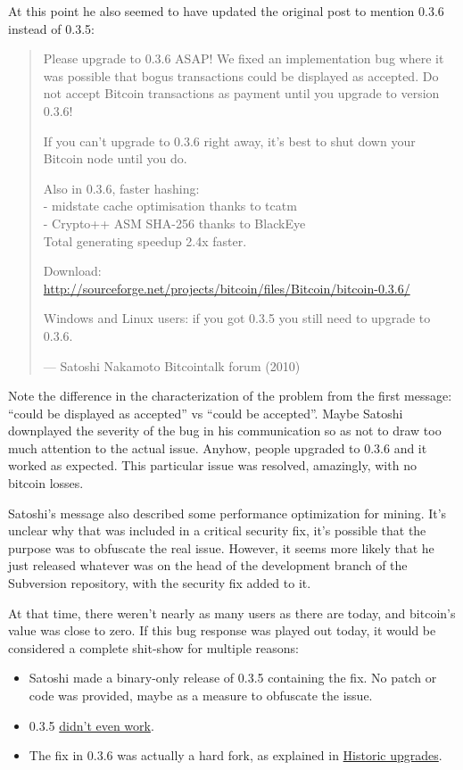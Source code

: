 At this point he also seemed to have updated the original post to
mention 0.3.6 instead of 0.3.5:

\begin{quote}
Please upgrade to 0.3.6 ASAP! We fixed an implementation bug where it
was possible that bogus transactions could be displayed as accepted. Do
not accept Bitcoin transactions as payment until you upgrade to version
0.3.6!

If you can't upgrade to 0.3.6 right away, it's best to shut down your
Bitcoin node until you do.

Also in 0.3.6, faster hashing:\\
- midstate cache optimisation thanks to tcatm\\
- Crypto++ ASM SHA-256 thanks to BlackEye\\
Total generating speedup 2.4x faster.

Download:\\
\url{http://sourceforge.net/projects/bitcoin/files/Bitcoin/bitcoin-0.3.6/}

Windows and Linux users: if you got 0.3.5 you still need to upgrade to
0.3.6.

---  Satoshi Nakamoto Bitcointalk forum (2010)
\end{quote}

Note the difference in the characterization of the problem from the
first message: ``could be displayed as accepted'' vs ``could be
accepted''. Maybe Satoshi downplayed the severity of the bug in his
communication so as not to draw too much attention to the actual issue.
Anyhow, people upgraded to 0.3.6 and it worked as expected. This
particular issue was resolved, amazingly, with no bitcoin losses.

Satoshi's message also described some performance optimization for
mining. It's unclear why that was included in a critical security fix,
it's possible that the purpose was to obfuscate the real issue. However,
it seems more likely that he just released whatever was on the head of
the development branch of the Subversion repository, with the security
fix added to it.

At that time, there weren't nearly as many users as there are today, and
bitcoin's value was close to zero. If this bug response was played out
today, it would be considered a complete shit-show for multiple reasons:

\begin{itemize}
\item
  Satoshi made a binary-only release of 0.3.5 containing the fix. No
  patch or code was provided, maybe as a measure to obfuscate the issue.
\item
  0.3.5
  \href{https://bitcointalk.org/index.php?topic=626.msg6455\#msg6455}{didn't
  even work}.
\item
  The fix in 0.3.6 was actually a hard fork, as explained in
  \protect\hyperlink{historic-upgrades}{Historic upgrades}.
\end{itemize}

